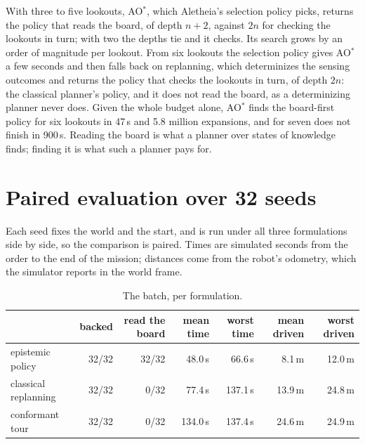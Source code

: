\documentclass[11pt,a4paper]{article}
\theoremstyle{definition}
\begin{document}
With three to five lookouts, AO$^*$, which Aletheia's selection policy picks, returns the policy that reads the board, of depth $n + 2$, against $2n$ for checking the lookouts in turn; with two the depths tie and it checks. Its search grows by an order of magnitude per lookout. From six lookouts the selection policy gives AO$^*$ a few seconds and then falls back on replanning, which determinizes the sensing outcomes and returns the policy that checks the lookouts in turn, of depth $2n$: the classical planner's policy, and it does not read the board, as a determinizing planner never does. Given the whole budget alone, AO$^*$ finds the board-first policy for six lookouts in 47\,s and 5.8 million expansions, and for seven does not finish in 900\,s. Reading the board is what a planner over states of knowledge finds; finding it is what such a planner pays for.

\section{Paired evaluation over 32 seeds}

Each seed fixes the world and the start, and is run under all three
formulations side by side, so the comparison is paired. Times are simulated
seconds from the order to the end of the mission; distances come from the
robot's odometry, which the simulator reports in the world frame.

\begin{table}[H]
\centering
\small
\begin{tabular}{@{}lrrrrrr@{}}
\toprule
& backed & read the board & mean time & worst time & mean driven & worst driven \\
\midrule
epistemic policy & 32/32 & 32/32 & 48.0\,s & 66.6\,s & 8.1\,m & 12.0\,m \\
classical replanning & 32/32 & 0/32 & 77.4\,s & 137.1\,s & 13.9\,m & 24.8\,m \\
conformant tour & 32/32 & 0/32 & 134.0\,s & 137.4\,s & 24.6\,m & 24.9\,m \\
\bottomrule
\end{tabular}
\caption{The batch, per formulation.}
\end{table}
\end{document}
